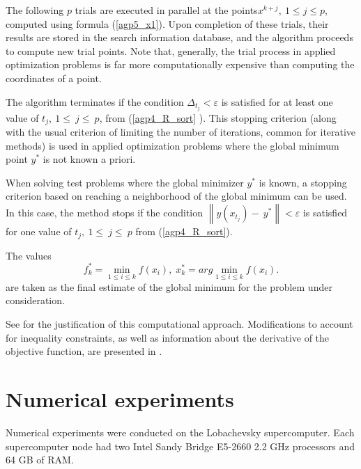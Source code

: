 \documentclass[runningheads]{llncs}
\begin{document}
The following $p$ trials are executed in parallel at the points$x^{k+j},\ 1\leq j\leq p$,  computed using formula  (\ref{agp5_x1}). Upon completion of these trials, their results are stored in the search information database, and the algorithm proceeds to compute new trial points. Note that, generally, the trial process in applied optimization problems is far more computationally expensive than computing the coordinates of a point.

The algorithm terminates if the condition \(\Delta_{t_j} < \varepsilon\) is satisfied for at least one value of $t_j,\ 1\le\ j\le\ p$, from (\ref{agp4_R_sort} ). This stopping criterion (along with the usual criterion of limiting the number of iterations, common for iterative methods) is used in applied optimization problems where the global minimum point $y^*$ is not known a priori.

When solving test problems where the global minimizer $y^*$ is known, a stopping criterion based on reaching a neighborhood of the global minimum can be used. In this case, the method stops if the condition $\left\|y(x_{t_j})-\ y^\ast\right\| < \varepsilon$ is satisfied for one value of $t_j,\ 1\le\ j\le\ p$ from (\ref{agp4_R_sort}).

The values  
\begin{equation} 
	f_k^*=\min_{1\leq i \leq k}f(x_i), \; x_k^*=arg \min_{1\leq i \leq k}f(x_i). 
\end{equation} 
are taken as the final estimate of the global minimum for the problem under consideration.


See \cite{Strongin2000,Barkalov2016} for the justification of this computational approach. Modifications to account for inequality constraints, as well as information about the derivative of the objective function, are presented in \cite{Barkalov2002, Gergel1997, Barkalov2023, Gegrel2021}.





\section{Numerical experiments}\label{SecR}

Numerical experiments were conducted on the Lobachevsky supercomputer. Each supercomputer node had two Intel Sandy Bridge E5-2660 2.2 GHz processors and 64 GB of RAM.
\end{document}
